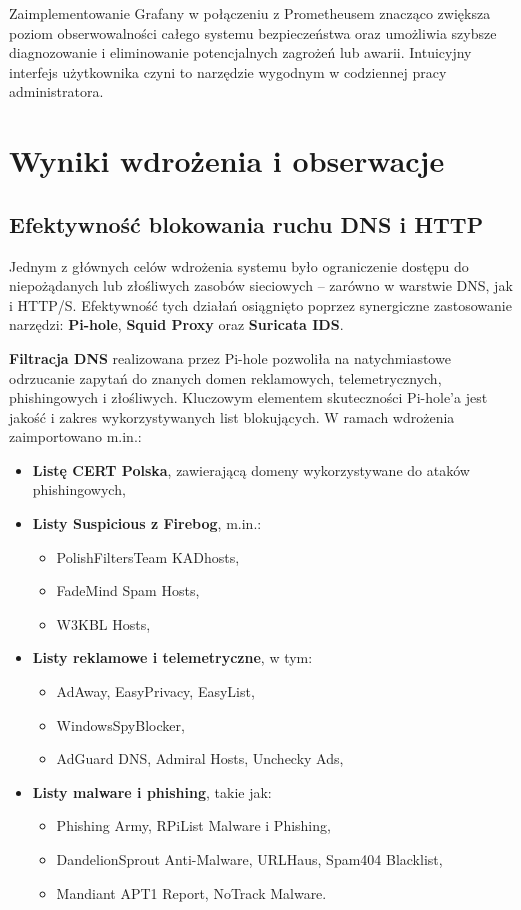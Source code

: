 \documentclass[
    left=2.5cm,         %
    right=2.5cm,        %
    top=2.5cm,          %
    bottom=3cm,         %
    bindingoffset=6mm,  %
    nohyphenation=true %
]{eiti/eiti-thesis} %
\begin{document}
Zaimplementowanie Grafany w połączeniu z Prometheusem znacząco zwiększa poziom obserwowalności całego systemu bezpieczeństwa oraz umożliwia szybsze diagnozowanie 
i eliminowanie potencjalnych zagrożeń lub awarii. Intuicyjny interfejs użytkownika czyni to narzędzie wygodnym w codziennej pracy administratora.


\section{ Wyniki wdrożenia i obserwacje}
\subsection{Efektywność blokowania ruchu DNS i HTTP}

Jednym z głównych celów wdrożenia systemu było ograniczenie dostępu do niepożądanych lub złośliwych zasobów sieciowych – zarówno w warstwie DNS, jak i HTTP/S. Efektywność tych działań osiągnięto poprzez synergiczne zastosowanie narzędzi: \textbf{Pi-hole}, \textbf{Squid Proxy} oraz \textbf{Suricata IDS}.

\textbf{Filtracja DNS} realizowana przez Pi-hole pozwoliła na natychmiastowe odrzucanie zapytań do znanych domen reklamowych, telemetrycznych, phishingowych 
i złośliwych. Kluczowym elementem skuteczności Pi-hole’a jest jakość i zakres wykorzystywanych list blokujących. W ramach wdrożenia zaimportowano m.in.:
\begin{itemize}
    \item \textbf{Listę CERT Polska}\cite{cert_pl}, zawierającą domeny wykorzystywane do ataków phishingowych\cite{certpl-domains},
    \item \textbf{Listy Suspicious z Firebog\cite{firebog}}, m.in.:
    \begin{itemize}
        \item PolishFiltersTeam KADhosts,
        \item FadeMind Spam Hosts,
        \item W3KBL Hosts,
    \end{itemize}
    \item \textbf{Listy reklamowe i telemetryczne}, w tym:
    \begin{itemize}
        \item AdAway, EasyPrivacy, EasyList,
        \item WindowsSpyBlocker,
        \item AdGuard DNS, Admiral Hosts, Unchecky Ads,
    \end{itemize}
    \item \textbf{Listy malware i phishing}, takie jak:
    \begin{itemize}
        \item Phishing Army, RPiList Malware i Phishing,
        \item DandelionSprout Anti-Malware, URLHaus, Spam404 Blacklist,
        \item Mandiant APT1 Report, NoTrack Malware.
    \end{itemize}
\end{itemize}
\end{document}
